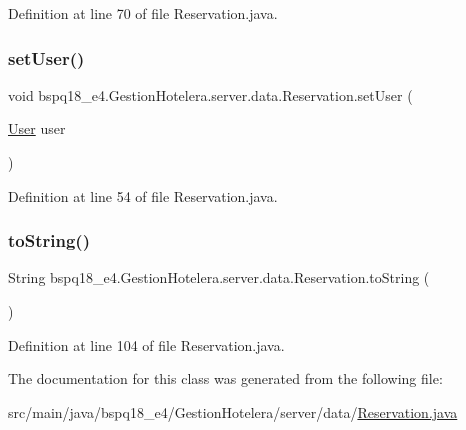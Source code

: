 Definition at line 70 of file Reservation.\+java.

\mbox{\label{classbspq18__e4_1_1_gestion_hotelera_1_1server_1_1data_1_1_reservation_a5803f7ee399f58b44cac0d19c454a2da}} 
\subsubsection{\texorpdfstring{set\+User()}{setUser()}}
{\footnotesize\ttfamily void bspq18\+\_\+e4.\+Gestion\+Hotelera.\+server.\+data.\+Reservation.\+set\+User (\begin{DoxyParamCaption}\item[{\mbox{\hyperlink{classbspq18__e4_1_1_gestion_hotelera_1_1server_1_1data_1_1_user}{User}}}]{user }\end{DoxyParamCaption})}



Definition at line 54 of file Reservation.\+java.

\mbox{\label{classbspq18__e4_1_1_gestion_hotelera_1_1server_1_1data_1_1_reservation_a0861b284470c3b9ada014ddceb4edfca}} 
\subsubsection{\texorpdfstring{to\+String()}{toString()}}
{\footnotesize\ttfamily String bspq18\+\_\+e4.\+Gestion\+Hotelera.\+server.\+data.\+Reservation.\+to\+String (\begin{DoxyParamCaption}{ }\end{DoxyParamCaption})}



Definition at line 104 of file Reservation.\+java.



The documentation for this class was generated from the following file\+:\begin{DoxyCompactItemize}
\item 
src/main/java/bspq18\+\_\+e4/\+Gestion\+Hotelera/server/data/\mbox{\hyperlink{_reservation_8java}{Reservation.\+java}}\end{DoxyCompactItemize}

